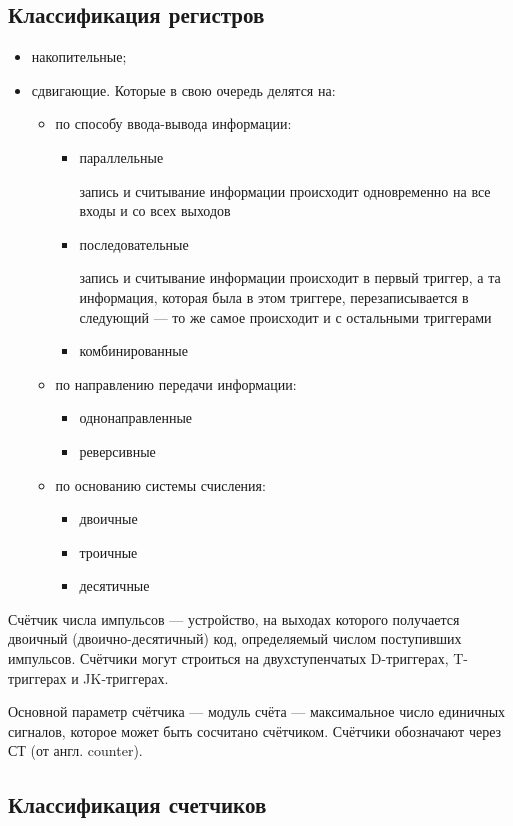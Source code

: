 \subsection*{Классификация регистров}

\begin{itemize}
\item накопительные;
\item сдвигающие. Которые в свою очередь делятся на:
	\begin{itemize}
	\item по способу ввода-вывода информации:
		\begin{itemize}
		\item параллельные
			\par запись и считывание информации происходит одновременно на все входы и со всех выходов
		\item последовательные
			\par запись и считывание информации происходит в первый триггер, а та информация, которая была в этом триггере, перезаписывается в следующий --- то же самое происходит и с остальными триггерами
		\item комбинированные
		\end{itemize}
	\item по направлению передачи информации:
		\begin{itemize}
			\item однонаправленные
			\item реверсивные
		\end{itemize}
	\item по основанию системы счисления:
		\begin{itemize}
			\item двоичные
			\item троичные
			\item десятичные
		\end{itemize}
	\end{itemize}
\end{itemize}

Счётчик числа импульсов --- устройство, на выходах которого получается двоичный (двоично-десятичный) код, определяемый числом поступивших импульсов. Счётчики могут строиться на двухступенчатых D-триггерах, T-триггерах и JK-триггерах.

Основной параметр счётчика --- модуль счёта --- максимальное число единичных сигналов, которое может быть сосчитано счётчиком. Счётчики обозначают через СТ (от англ. counter).

\subsection*{Классификация счетчиков}

